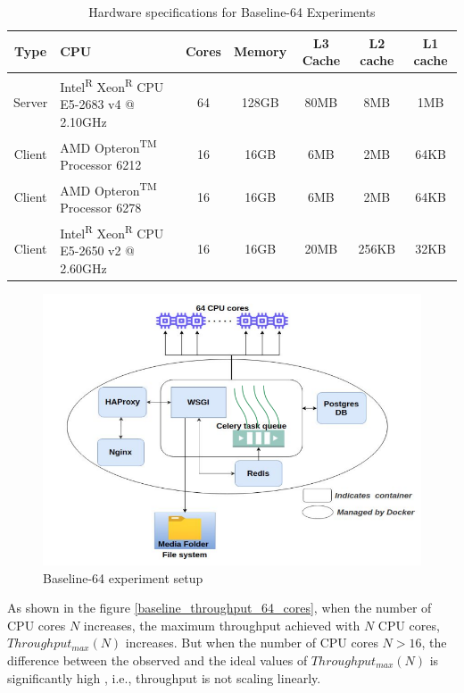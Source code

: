 \documentclass{iitbreport}
\begin{document}
\begin{table}[!htb]
  \begin{tabular}{|c|p{9em}|c|c|c|c|c|}
    \hline
    Type&CPU&Cores&Memory&L3 Cache&L2 cache&L1 cache\\
    \hline
    Server & Intel\textsuperscript{R} Xeon\textsuperscript{R} CPU E5-2683 v4 @ 2.10GHz& 64&128GB&80MB&8MB&1MB\\
    \hline
    Client & AMD Opteron\textsuperscript{TM} Processor 6212 & 16&16GB&6MB&2MB&64KB\\
    \hline
    Client & AMD Opteron\textsuperscript{TM} Processor 6278 & 16&16GB&6MB&2MB&64KB\\
    \hline
    Client & Intel\textsuperscript{R} Xeon\textsuperscript{R} CPU E5-2650 v2 @ 2.60GHz & 16&16GB&20MB&256KB&32KB\\
  \hline
\end{tabular}
\caption{Hardware specifications for  Baseline-64 Experiments}
  \label{tab:hardware_64_cores}
\end{table}



\begin{figure}[!htb]
  \centering
  \includegraphics[width=\linewidth]{Images/Baseline-64.png}
  \caption{Baseline-64 experiment setup}
  \label{baseline_64_setup}
\end{figure}


As shown in the figure \ref{baseline_throughput_64_cores}, when the number of CPU cores $N$ increases, the maximum throughput achieved with $N$ CPU cores, $Throughput_{max}(N)$ increases. But when the number of CPU cores $N>16$, the difference between the  observed and the ideal values of $Throughput_{max}(N)$ is significantly high , i.e., throughput is not scaling linearly.
\end{document}
